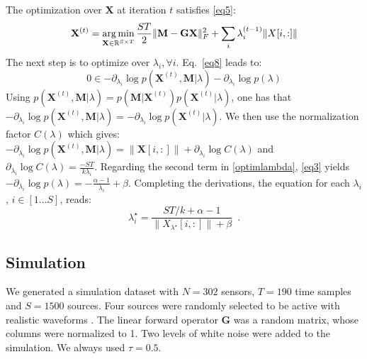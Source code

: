 The optimization over $\mathbf{X}$ at iteration $t$ satisfies \eqref{eq5}: %
\begin{equation*}	\mathbf{X}^{(t)}=\mathop{\mathrm{arg}\,\mathrm{min}}_{\mathbf{X}\in\mathbb{R}^{S\times T}}
\frac{ST}{2}\|\mathbf{M}-\mathbf{GX}\|_{F}^2 + \sum_{i} \lambda_i^{(t-1)}\|X[i,:]\|
\end{equation*}
The next step is to optimize over $\lambda_i, \forall i$. Eq.~\eqref{eq8} leads to:
\begin{equation} \label{optimlambda}
0\in -\partial_{\lambda_i} \log p(\mathbf{X}^{(t)},\mathbf{M}|\lambda) -\partial_{\lambda_i} \log p(\lambda)
\end{equation} 
Using $p(\mathbf{X}^{(t)},\mathbf{M}|\lambda)=p(\mathbf{M}|\mathbf{X}^{(t)})p(\mathbf{X}^{(t)}|\lambda)$, one has that $-\partial_{\lambda_i} \log p(\mathbf{X}^{(t)}, \mathbf{M}|\lambda)=-\partial_{\lambda_i} \log p(\mathbf{X}^{(t)}|\lambda)$. We then use the normalization factor $C(\lambda)$ which gives:\\ $- \partial_{\lambda_i} \log p(\mathbf{X}^{(t)}, \mathbf{M}|\lambda)=\|\mathbf{X}[i,:]\| + \partial_{\lambda_i} \log C(\lambda)$ and $\partial_{\lambda_i} \log C(\lambda)=\frac{-ST}{k\lambda_i}$. Regarding the second term in \eqref{optimlambda}, \eqref{eq3} yields $-\partial_{\lambda_i} \log p(\lambda) = -\frac{\alpha-1}{\lambda_i} + \beta$.
Completing the derivations, the equation for each $\lambda_i$, $i\in[1\dots S]$, reads:
\begin{equation} \label{eq9}
\lambda^\star_i=\frac{ST/k + \alpha - 1}{\|X_{\lambda^\star}[i,:]\| + \beta} \enspace .
\end{equation}


\subsection{Simulation}

We generated a simulation dataset with $N=302$ sensors, $T=190$ time samples and $S=1500$ sources. Four sources were randomly selected to be active with realistic waveforms%
. The linear forward operator $\mathbf{G}$ was a random matrix, whose columns were normalized to 1. Two levels of white noise were added to the simulation. We always used $\tau=0.5$.


